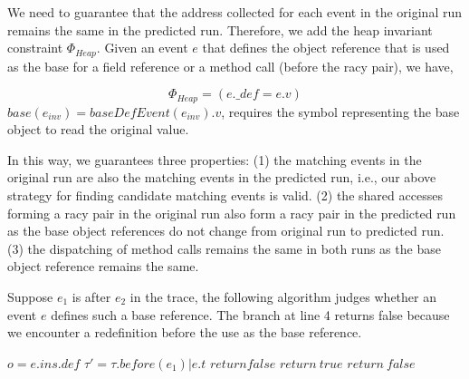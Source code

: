We need to guarantee that the address collected for each event in the original run remains the same in the predicted run. 
Therefore, we add the heap invariant constraint $\Phi_{Heap}$.
Given an event $e$ that defines the object reference that is used as the base for a field reference or a method call (before the racy pair), we have,


$$
\Phi_{Heap}=(e.\_def=e.v)
$$
$base(e_{inv})=baseDefEvent(e_{inv}).v$, requires the symbol representing the base object to read the original value. 




In this way, we guarantees three properties: (1) the matching events in the original run are also the matching events in the predicted run, i.e., our above strategy for finding candidate matching events is valid. (2) the shared accesses forming a racy pair in the original run also form a racy pair in the predicted run as the base object references do not change from original run to predicted run.   (3) the dispatching of method calls remains the same in both runs as the base object reference remains the same. 


Suppose $e_1$ is after $e_2$ in the trace, the following algorithm judges whether an event $e$ defines such a base reference.  The branch at line 4 returns false because we encounter a redefinition before the use as the base reference.  

\begin{algorithmic}[3]
\State $o = e.ins.def$
\State $\tau'=\tau.before(e_1)|e.t$
\State $return false$
\Else
{
    \State $ return \ true$
    \EndIf
}
\EndIf
\EndFor
\State $return \ false$
\end{algorithmic}







